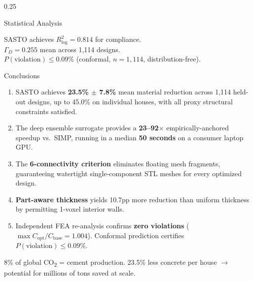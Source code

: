 \documentclass[final]{beamer}
\newcommand{\bodytext}{\fontsize{13.5}{16}\selectfont\color{textdark}\justifying}
\begin{document}
\begin{frame}[t]
\begin{columns}[T]
\begin{column}{0.25\textwidth}
\begin{sectionbox}{Statistical Analysis}
\vspace{4pt}
\begin{eqbox}
\centering
{\small SASTO achieves $R^2_{\log} = 0.814$ for compliance.\\
$\Gamma_D = 0.255$ mean across 1,114 designs.\\
$P(\text{violation}) \le 0.09\%$ (conformal, $n = 1{,}114$, distribution-free).}
\end{eqbox}
\end{sectionbox}

\vspace{4pt}

\begin{sectionbox}{Conclusions}
\bodytext

\begin{enumerate}[leftmargin=*, itemsep=4pt, label={\color{accentteal}\bfseries\arabic*.}]
    \item SASTO achieves \textbf{23.5\% $\pm$ 7.8\%} mean material reduction across 1,114 held-out designs, up to 45.0\% on individual houses, with all proxy structural constraints satisfied.
    \item The deep ensemble surrogate provides a \textbf{23--92$\times$} empirically-anchored speedup vs.\ SIMP, running in a median \textbf{50 seconds} on a consumer laptop GPU.
    \item The \textbf{6-connectivity criterion} eliminates floating mesh fragments, guaranteeing watertight single-component STL meshes for every optimized design.
    \item \textbf{Part-aware thickness} yields 10.7pp more reduction than uniform thickness by permitting 1-voxel interior walls.
    \item Independent FEA re-analysis confirms \textbf{zero violations} ($\max C_\mathrm{opt}/C_\mathrm{base} = 1.004$). Conformal prediction certifies $P(\text{violation}) \le 0.09\%$.
\end{enumerate}

\vspace{4pt}
\begin{eqbox}
\centering
{\small 8\% of global CO\textsubscript{2} = cement production. 23.5\% less concrete per house $\to$ potential for millions of tons saved at scale.}
\end{eqbox}
\end{sectionbox}

\vspace{4pt}


\end{column}
\end{columns}
\end{frame}
\end{document}

